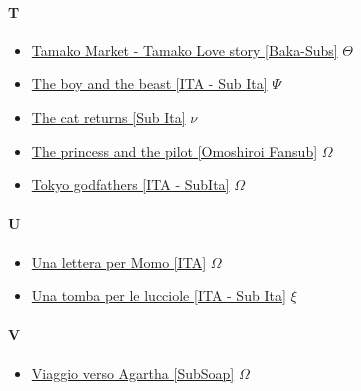 		\paragraph{T} \hypertarget{FT}{}
			\begin{itemize}
			
			\item \href{https://mega.nz/#!kT4iCSII!NznC0PqK-LxqgvHjqLd3I2uzHK3_4bcUaW5XGWaq7Js} {Tamako Market - Tamako Love story [Baka-Subs]} $\varTheta$   \\
			\item \href{https://mega.nz/#!oPhTkAbR!ZPCYjIDPrQDJ-_NCmHHkkyCDKBaYV5ry0HMkluDpgMk} {The boy and the beast [ITA - Sub Ita]} $\Psi$   \\
			\item \href{https://mega.nz/#!SgVzSJzL!dIggOkfhhN45NP0t5mjIns2ptlJEEPXgiuwAxPV2msY} {The cat returns [Sub Ita]} $\nu$   \\
			\item \href{https://mega.nz/#!kqhCSAhZ!DeuKxYUBLVJylClSRExgVRUuXDYWN4JnqE5dMgPTh7U} {The princess and the pilot [Omoshiroi Fansub]} $\Omega$   \\
			\item \href{https://mega.nz/#!8qxBxKrB!XCSV7Sa0SVi9jVBL7Nj0SUTf5iurFW-Lg-3Fl0fXB_w} {Tokyo godfathers [ITA - SubIta]} $\Omega$   \\
			
			
			\end{itemize}
		
		\paragraph{U} \hypertarget{FU}{}
			\begin{itemize}
				
				\item \href{https://mega.nz/#!NvICXK5L!bPT5L2EPl-e_exIu6ZgRRoZFNAfSb4VZjSHEobzVVEk} {Una lettera per Momo [ITA]} $\Omega$   \\
				\item \href{https://mega.nz/#!GgxmyRzZ!V37zGQBKqtFVHaH7U2Xa8KFieHt5M8VsDs7jAMPu6ZM} {Una tomba per le lucciole [ITA - Sub Ita]} $\xi$   \\
			
			\end{itemize}
		
		\paragraph{V} \hypertarget{FV}{}
			\begin{itemize}
				
				\item \href{https://mega.nz/#!V7ZRyRZI!KlRFtOhgwSzQY3PeqgEiCBVadkrYsGNGqiwc8Vm_L4E} {Viaggio verso Agartha [SubSoap]} $\Omega$   \\
				
			\end{itemize}
		 
